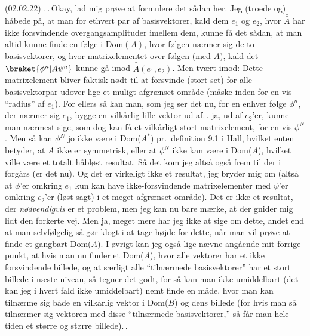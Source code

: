 \documentclass{report}
\begin{document}
(02.02.22) .\,.\,Okay, lad mig prøve at formulere det sådan her. Jeg (troede og) håbede på, at man for ethvert par af basisvektorer, kald dem $e_1$ og $e_2$, hvor $\bar{\bar{A}}$ har ikke forsvindende overgangsamplituder imellem dem, kunne få det sådan, at man altid kunne finde en følge i Dom$(A)$, hvor følgen nærmer sig de to basisvektorer, og hvor matrixelementet over følgen (med $A$), kald det $\braket{\phi^n| A \psi^n}$ kunne gå imod $\bar{\bar{A}}(e_1, e_2)$. Men tvært imod: Dette matrixelement bliver faktisk nødt til at forsvinde (stort set) for alle basisvektorpar udover lige et muligt afgrænset område (måske inden for en vis ``radius'' af $e_1$). For ellers så kan man, som jeg ser det nu, for en enhver følge $\phi^n$, der nærmer sig $e_1$, bygge en vilkårlig lille vektor ud af.\,. ja, ud af $e_2$'er, kunne man nærmest sige, som dog kan få et vilkårligt stort matrixelement, for en vis $\phi^N$. Men så kan $\phi^N$ jo ikke være i Dom($A^*$) pr.\ definition 9.1 i Hall, hvilket enten betyder, at $A$ ikke er symmetrisk, eller at $\phi^N$ ikke kan være i Dom($A$), hvilket ville være et totalt håbløst resultat. Så det kom jeg altså også frem til der i forgårs (er det nu). Og det er virkeligt ikke et resultat, jeg bryder mig om (altså at $\phi$'er omkring $e_1$ kun kan have ikke-forsvindende matrixelementer med $\psi$'er omkring $e_2$'er (løst sagt) i et meget afgrænset område). Det er ikke et resultat, der \emph{nødvendigvis} er et problem, men jeg kan nu bare mærke, at der gnider mig lidt den forkerte vej. Men ja, meget mere har jeg ikke at sige om dette, andet end at man selvfølgelig så gør klogt i at tage højde for dette, når man vil prøve at finde et gangbart Dom($A$). I øvrigt kan jeg også lige nævne angående mit forrige punkt, at hvis man nu finder et Dom($A$), hvor alle vektorer har et ikke forsvindende billede, og at særligt alle ``tilnærmede basisvektorer'' har et stort billede i næste niveau, så tegner det godt, for så kan man ikke umiddelbart (det kan jeg i hvert fald ikke umiddelbart) nemt finde en måde, hvor man kan tilnærme sig både en vilkårlig vektor i Dom($B$) og dens billede (for hvis man så tilnærmer sig vektoren med disse ``tilnærmede basisvektorer,'' så får man hele tiden et større og større billede).\,.
\end{document}
